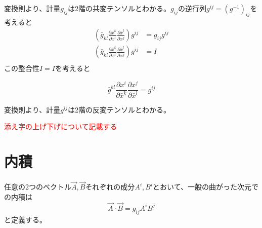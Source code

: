 \documentclass[dvipdfmx]{report} %
\begin{document}
変換則より、計量$g_{ij}$は2階の共変テンソルとわかる。$g_{ij}$の逆行列$g^{ij} = (g^{-1})_{ij}$を考えると
\begin{equation*}
\begin{split}
	\left( \bar{g}_{kl} \frac{\partial \bar{x}^k}{\partial x^i} \frac{\partial \bar{x}^l}{\partial x^j} \right) g^{ij} &= g_{ij} g^{ij}\\
	\left( \bar{g}_{kl} \frac{\partial \bar{x}^k}{\partial x^i} \frac{\partial \bar{x}^l}{\partial x^j} \right) g^{ij} &= I\\
\end{split}
\end{equation*}
この整合性$I = I$を考えると
\begin{tcolorbox}[title=計量$g^{ij}$の変換則]
	\[ \bar{g}^{kl} \frac{\partial x^i}{\partial \bar{x}^k} \frac{\partial x^j}{\partial \bar{x}^l} = g^{ij} \]
\end{tcolorbox}
変換則より、計量$g^{ij}$は2階の反変テンソルとわかる。

\textcolor{red}{添え字の上げ下げについて記載する}


\section{内積}
任意の2つのベクトル$\vec{A}, \vec{B}$それぞれの成分$A^i, B^i$とおいて、一般の曲がった次元での内積は
\[ \vec{A} \cdot \vec{B} = g_{ij} A^i B^j \]
と定義する。


\end{document}
